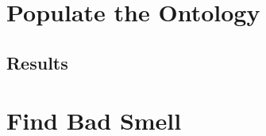 \documentclass [14 pt]{article}
\begin{document}
\section{Populate the Ontology}

\subsection{Results}

\section{Find Bad Smell}
\end{document}
